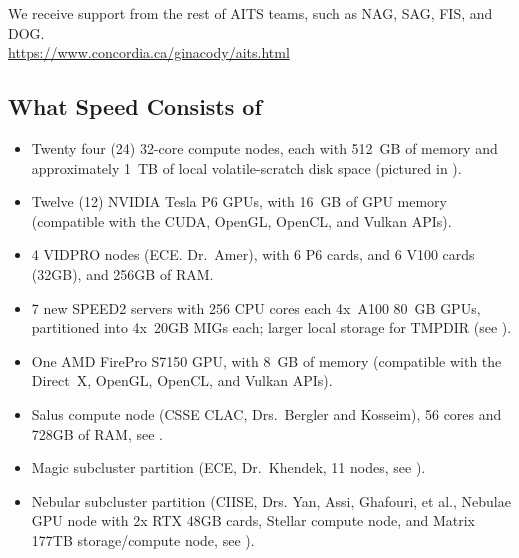 \documentclass{easychair}
\begin{document}
\noindent We receive support from the rest of AITS teams, such as NAG, SAG, FIS, and DOG.\\
\url{https://www.concordia.ca/ginacody/aits.html}


\subsection{What Speed Consists of}
\label{sect:speed-arch}

\begin{itemize}
	\item
	Twenty four (24) 32-core compute nodes, each with 512~GB of memory and 
	approximately 1~TB of local volatile-scratch disk space (pictured in ).

	\item
	Twelve (12) NVIDIA Tesla P6 GPUs, with 16~GB of GPU memory (compatible with the 
	CUDA, OpenGL, OpenCL, and Vulkan APIs). 

	\item
	4 VIDPRO nodes (ECE. Dr.~Amer), with 6 P6 cards, and 6 V100 cards (32GB), and 
	256GB of RAM.

	\item
	7 new SPEED2 servers with 256 CPU cores each 4x~A100 80~GB GPUs, partitioned
	into 4x~20GB MIGs  each; larger local storage for TMPDIR (see ).

	\item
	One AMD FirePro S7150 GPU, with 8~GB of memory (compatible with the
	Direct~X, OpenGL, OpenCL, and Vulkan APIs).

 	\item
  	Salus compute node (CSSE CLAC, Drs.~Bergler and Kosseim), 56 cores and 728GB of RAM, see .

	\item
 	Magic subcluster partition (ECE, Dr.~Khendek, 11 nodes, see ).

  	\item
   	Nebular subcluster partition (CIISE, Drs. Yan, Assi, Ghafouri, et al., Nebulae GPU node with 2x RTX 48GB cards,
    	Stellar compute node, and Matrix 177TB storage/compute node, see ).
\end{itemize}
\end{document}
